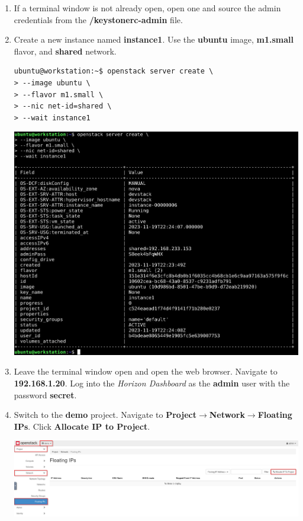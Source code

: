 \documentclass[letterpaper, 12pt]{article}
\begin{document}
\begin{enumerate}
    \item If a terminal window is not already open, open one and source the admin credentials from the 
    \textbf{\texttildemid/keystonerc-admin} file.

    \item Create a new instance named \textbf{instance1}. Use the \textbf{ubuntu} image, \textbf{m1.small} flavor, and
    \textbf{shared} network.
\begin{lstlisting}
ubuntu@workstation:~$ openstack server create \
> --image ubuntu \
> --flavor m1.small \
> --nic net-id=shared \
> --wait instance1
\end{lstlisting}

    \begin{center}
        \includegraphics[width=\linewidth]{images/part3/step2.png}
    \end{center}

    \item Leave the terminal window open and open the web browser. Navigate to \textbf{192.168.1.20}. Log into the
    \textit{Horizon Dashboard} as the \textbf{admin} user with the password \textbf{secret}.


    \item Switch to the \textbf{demo} project. Navigate to \textbf{Project$\rightarrow$Network$\rightarrow$Floating
    IPs}. Click \textbf{Allocate IP to Project}.

    \begin{center}
        \includegraphics[width=\linewidth]{images/part3/step4.png}
    \end{center}


\end{enumerate}
\end{document}
